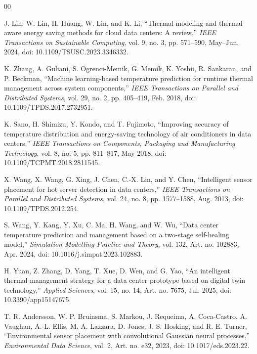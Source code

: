 \documentclass[12pt,a4paper]{article}
\begin{document}
\begin{thebibliography}{00}

J. Lin, W. Lin, H. Huang, W. Lin, and K. Li, ``Thermal modeling and thermal-aware energy saving methods for cloud data centers: A review,'' \textit{IEEE Transactions on Sustainable Computing}, vol. 9, no. 3, pp. 571--590, May--Jun. 2024, doi: 10.1109/TSUSC.2023.3346332.

K. Zhang, A. Guliani, S. Ogrenci-Memik, G. Memik, K. Yoshii, R. Sankaran, and P. Beckman, ``Machine learning-based temperature prediction for runtime thermal management across system components,'' \textit{IEEE Transactions on Parallel and Distributed Systems}, vol. 29, no. 2, pp. 405--419, Feb. 2018, doi: 10.1109/TPDS.2017.2732951.

K. Sano, H. Shimizu, Y. Kondo, and T. Fujimoto, ``Improving accuracy of temperature distribution and energy-saving technology of air conditioners in data centers,'' \textit{IEEE Transactions on Components, Packaging and Manufacturing Technology}, vol. 8, no. 5, pp. 811--817, May 2018, doi: 10.1109/TCPMT.2018.2811545.

X. Wang, X. Wang, G. Xing, J. Chen, C.-X. Lin, and Y. Chen, ``Intelligent sensor placement for hot server detection in data centers,'' \textit{IEEE Transactions on Parallel and Distributed Systems}, vol. 24, no. 8, pp. 1577--1588, Aug. 2013, doi: 10.1109/TPDS.2012.254.

S. Wang, Y. Kang, Y. Xu, C. Ma, H. Wang, and W. Wu, ``Data center temperature prediction and management based on a two-stage self-healing model,'' \textit{Simulation Modelling Practice and Theory}, vol. 132, Art. no. 102883, Apr. 2024, doi: 10.1016/j.simpat.2023.102883.

H. Yuan, Z. Zhang, D. Yang, T. Xue, D. Wen, and G. Yao, ``An intelligent thermal management strategy for a data center prototype based on digital twin technology,'' \textit{Applied Sciences}, vol. 15, no. 14, Art. no. 7675, Jul. 2025, doi: 10.3390/app15147675.

T. R. Andersson, W. P. Bruinsma, S. Markou, J. Requeima, A. Coca-Castro, A. Vaughan, A.-L. Ellis, M. A. Lazzara, D. Jones, J. S. Hosking, and R. E. Turner, ``Environmental sensor placement with convolutional Gaussian neural processes,'' \textit{Environmental Data Science}, vol. 2, Art. no. e32, 2023, doi: 10.1017/eds.2023.22.


\end{thebibliography}
\end{document}
